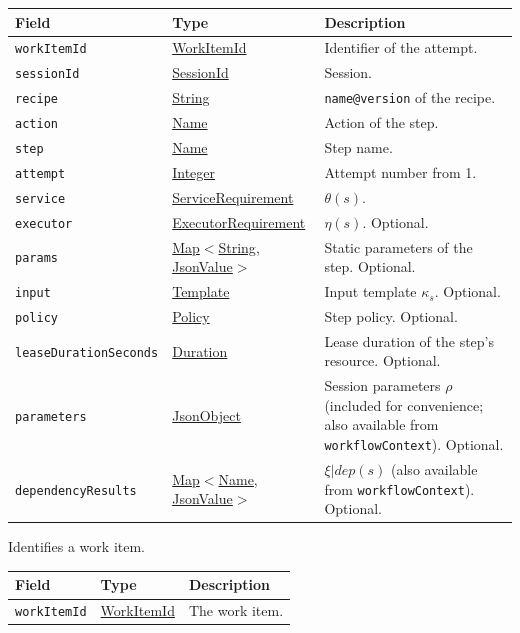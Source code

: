 \documentclass[a4paper]{arrowhead}
\newcommand{\mref}[1]{{\textcolor{ArrowheadPurple}{\hyperref[sec:model:#1]{#1}}}}
\newcommand{\pref}[1]{{\textcolor{ArrowheadGrey}{\hyperref[sec:model:primitives:#1]{#1}}}}
\begin{document}
{\small
\begin{longtable}{|p{3.9cm}|p{4.4cm}|p{7.5cm}|}

\hline
\rowcolor{gray!33} Field & Type & Description \\ \hline
\endhead
\texttt{workItemId} & \pref{WorkItemId} & Identifier of the attempt. \\ \hline
\texttt{sessionId} & \pref{SessionId} & Session. \\ \hline
\texttt{recipe} & \pref{String} & \texttt{name@version} of the recipe. \\ \hline
\texttt{action} & \pref{Name} & Action of the step. \\ \hline
\texttt{step} & \pref{Name} & Step name. \\ \hline
\texttt{attempt} & \pref{Integer} & Attempt number from 1. \\ \hline
\texttt{service} & \mref{ServiceRequirement} & $\theta(s)$. \\ \hline
\texttt{executor} & \mref{ExecutorRequirement} & $\eta(s)$. Optional. \\ \hline
\texttt{params} & \pref{Map}$<$\pref{String}, \pref{JsonValue}$>$ & Static parameters of the step. Optional. \\ \hline
\texttt{input} & \pref{Template} & Input template $\kappa_s$. Optional. \\ \hline
\texttt{policy} & \mref{Policy} & Step policy. Optional. \\ \hline
\texttt{leaseDurationSeconds} & \pref{Duration} & Lease duration of the step's resource. Optional. \\ \hline
\texttt{parameters} & \pref{JsonObject} & Session parameters $\rho$ (included for convenience; also available from \texttt{workflowContext}). Optional. \\ \hline
\texttt{dependencyResults} & \pref{Map}$<$\pref{Name}, \pref{JsonValue}$>$ & $\xi|dep(s)$ (also available from \texttt{workflowContext}). Optional. \\ \hline
\end{longtable}
}

Identifies a work item.

{\small
\begin{longtable}{|p{3.9cm}|p{4.4cm}|p{7.5cm}|}

\hline
\rowcolor{gray!33} Field & Type & Description \\ \hline
\endhead
\texttt{workItemId} & \pref{WorkItemId} & The work item. \\ \hline
\end{longtable}
}
\end{document}
